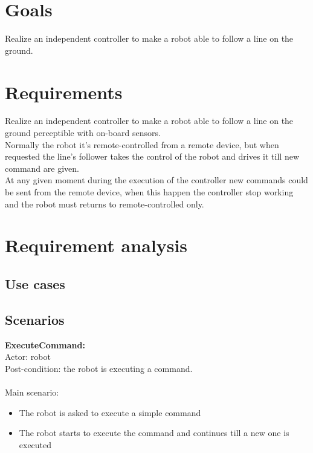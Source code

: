 \documentclass{llncs}
\newcommand{\labelsec}[1]{\label{sec:#1}}
\newcommand{\labelssec}[1]{\label{ssec:#1}}
\begin{document}
\section{Goals}
\labelsec{Goals}
Realize an independent controller to make a robot able to follow a line on the ground.\\ 

\section{Requirements}
\labelsec{Requirements}
Realize an independent controller to make a robot able to follow a line on the ground perceptible with on-board sensors.\\
Normally the robot it's remote-controlled from a remote device, but when requested the line's follower takes the control of the robot and drives it till new command are given. \\
At any given moment during the execution of the controller new commands could be sent from the remote device, when this happen the controller stop working and the robot must returns to remote-controlled only.

 
\section{Requirement analysis}
\labelsec{ReqAnalysis}

\subsection{Use cases}
\labelssec{UseCases}
\begin{center}
\end{center}

\subsection{Scenarios}
\labelssec{Scenarios}
\textbf{ExecuteCommand:}\\
Actor: robot\\
Post-condition: the robot is executing a command.\\
\\
Main scenario:
\begin{itemize}
	\item The robot is asked to execute a simple command
	\item The robot starts to execute the command and continues till a new one is executed
\end{itemize}
 
\end{document}
